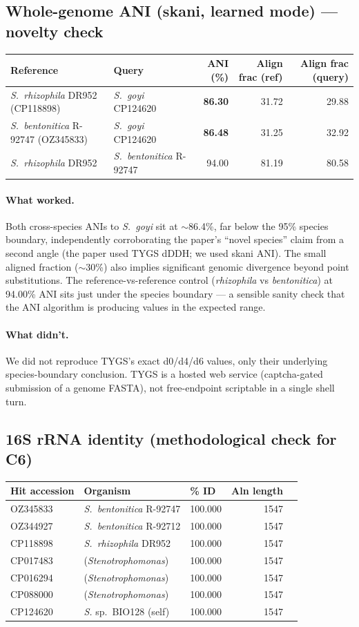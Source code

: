 \documentclass[11pt]{article}
\begin{document}
\subsection{Whole-genome ANI (skani, learned mode) --- novelty check}
\begin{tabular}{llrrr}
\toprule
Reference & Query & ANI (\%) & Align frac (ref) & Align frac (query)\\
\midrule
\emph{S.~rhizophila} DR952 (CP118898)   & \emph{S.~goyi} CP124620 & \textbf{86.30} & 31.72 & 29.88\\
\emph{S.~bentonitica} R-92747 (OZ345833) & \emph{S.~goyi} CP124620 & \textbf{86.48} & 31.25 & 32.92\\
\emph{S.~rhizophila} DR952 & \emph{S.~bentonitica} R-92747 & 94.00 & 81.19 & 80.58\\
\bottomrule
\end{tabular}

\paragraph{What worked.} Both cross-species ANIs to \emph{S.~goyi} sit at
$\sim$86.4\%, far below the 95\% species boundary, independently corroborating the
paper's ``novel species'' claim from a second angle (the paper used TYGS dDDH; we used
skani ANI). The small aligned fraction ($\sim$30\%) also implies significant genomic
divergence beyond point substitutions. The reference-vs-reference control
(\emph{rhizophila} vs \emph{bentonitica}) at 94.00\% ANI sits just under the species
boundary --- a sensible sanity check that the ANI algorithm is producing values in the
expected range.

\paragraph{What didn't.} We did not reproduce TYGS's exact d0/d4/d6 values, only their
underlying species-boundary conclusion. TYGS is a hosted web service (captcha-gated
submission of a genome FASTA), not free-endpoint scriptable in a single shell turn.

\subsection{16S rRNA identity (methodological check for C6)}
\begin{tabular}{lllrr}
\toprule
Hit accession & Organism & \% ID & Aln length\\
\midrule
OZ345833 & \emph{S.~bentonitica} R-92747 & 100.000 & 1547\\
OZ344927 & \emph{S.~bentonitica} R-92712 & 100.000 & 1547\\
CP118898 & \emph{S.~rhizophila} DR952    & 100.000 & 1547\\
CP017483 & (\emph{Stenotrophomonas})     & 100.000 & 1547\\
CP016294 & (\emph{Stenotrophomonas})     & 100.000 & 1547\\
CP088000 & (\emph{Stenotrophomonas})     & 100.000 & 1547\\
CP124620 & \emph{S.} sp.\ BIO128 (self)  & 100.000 & 1547\\
\bottomrule
\end{tabular}
\end{document}

